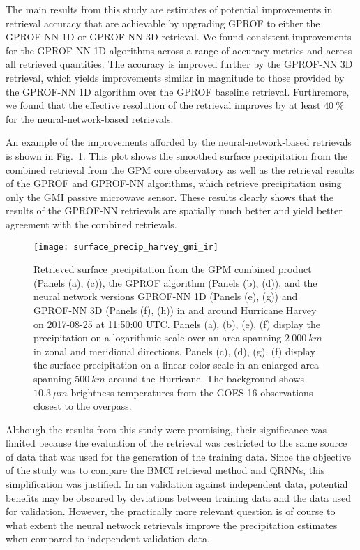 The main results from this study are estimates of potential improvements in
retrieval accuracy that are achievable by upgrading GPROF to either the GPROF-NN 
1D or GPROF-NN 3D retrieval. We found consistent improvements for the GPROF-NN
1D algorithms across a range of accuracy metrics and across all retrieved
quantities. The accuracy is improved further by the GPROF-NN 3D retrieval, which
yields improvements similar in magnitude to those provided by the GPROF-NN 1D
algorithm over the GPROF baseline retrieval. Furthremore, we found that the
effective resolution of the retrieval improves by at least $\SI{40}{\percent}$
for the  neural-network-based retrievals.

An example of the improvements afforded by the neural-network-based retrievals
is shown in Fig.~\ref{fig:machine_learning:hurricane_harvey}. This plot shows
the smoothed surface precipitation from the combined retrieval from the GPM core
observatory as well as the retrieval results of the GPROF and GPROF-NN
algorithms, which retrieve precipitation using only the GMI passive microwave
sensor. These results clearly shows that the results of the GPROF-NN retrievals
are spatially much better and yield better agreement with the combined
retrievals.

\begin{figure}
  \centering
  \texttt{[image: surface\_precip\_harvey\_gmi\_ir]}
  \caption{ Retrieved surface precipitation from the GPM combined product
    (Panels (a), (c)), the GPROF algorithm (Panels (b), (d)), and the neural
    network versions GPROF-NN 1D (Panels (e), (g)) and GPROF-NN 3D (Panels (f),
    (h)) in and around Hurricane Harvey on 2017-08-25 at 11:50:00 UTC. Panels
    (a), (b), (e), (f) display the precipitation on a logarithmic scale over an
    area spanning $2\ 000\ \unit{km}$ in zonal and meridional directions.
    Panels (c), (d), (g), (f) display the surface precipitation on a linear
    color scale in an enlarged area spanning $500\ \unit{km}$ around the
    Hurricane. The background shows $10.3\ \unit{\mu m}$ brightness temperatures
    from the GOES 16 observations closest to the overpass.
  }
  \label{fig:machine_learning:hurricane_harvey}
\end{figure}

Although the results from this study were promising, their significance was
limited because the evaluation of the retrieval was restricted to the same
source of data that was used for the generation of the training data. Since the
objective of the study was to compare the BMCI retrieval method and QRNNs, this
simplification was justified. In an validation against independent data,
potential benefits may be obscured by deviations between training data and the
data used for validation. However, the practically more relevant question is of
course to what extent the neural network retrievals improve the precipitation
estimates when compared to independent validation data.

